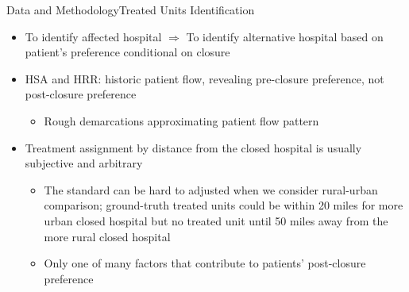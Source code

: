 \documentclass{beamer}
\theoremstyle{definition}
\begin{document}
\begin{frame}{Data and Methodology}{Treated Units Identification}
\begin{itemize}
\setlength{\itemsep}{18pt}
    \item To identify affected hospital $\Rightarrow$ To identify alternative hospital based on patient's preference conditional on closure
    \item HSA and HRR: historic patient flow, revealing pre-closure preference, not post-closure preference
    \begin{itemize}
        \item Rough demarcations approximating patient flow pattern
    \end{itemize}
    \item Treatment assignment by distance from the closed hospital is usually subjective and arbitrary
    \begin{itemize}
    \setlength{\itemsep}{6pt}
        \item The standard can be hard to adjusted when we consider rural-urban comparison; ground-truth treated units could be within 20 miles for more urban closed hospital but no treated unit until 50 miles away from the more rural closed hospital
        \item Only one of many factors that contribute to patients' post-closure preference
    \end{itemize}
\end{itemize}
    
\end{frame}
\end{document}
